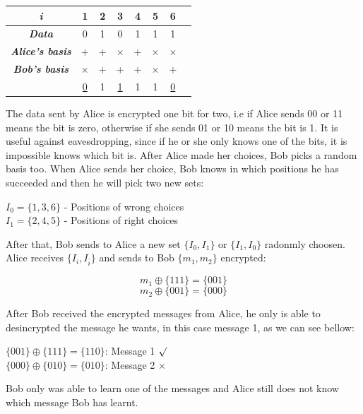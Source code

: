 \begin{table}[H]
\centering
\begin{tabular}{c|c|c|c|c|c|c|c}
\textbf{\textit{i}}         & 1 & 2 & 3 & 4 & 5 & 6      \\ \hline
\textbf{\textit{Data}}  & 0 & 1 & 0 & 1 & 1 & 1     \\ \hline
\textbf{\textit{Alice's basis}} & + & + & $\times$ &+ & $\times$ & $\times$ \\ \hline
\textbf{\textit{Bob's basis}} & $\times$ & + & + &+ & $\times$ & + \\ \hline

		 & \underline{0} & 1 & \underline{1} & 1 & 1 & \underline{0} \\ \hline
\end{tabular}
\end{table}

The data sent by Alice is encrypted one bit for two, i.e if Alice sends 00 or 11 means the bit is zero, otherwise if she sends 01 or 10 means the bit is 1. It is useful against eavesdropping, since if he or she only knows one of the bits, it is impossible knows which bit is.
After Alice made her choices, Bob picks a random basis too. When Alice sends her choice, Bob knows in which positions he has succeeded and then he will pick two new sets:

\begin{center}
$I_{0} = \{ 1,3,6 \}$ - Positions of wrong choices\\
$I_{1} = \{ 2,4,5 \}$ - Positions of right choices
\end{center}

After that, Bob sends to Alice a new set $ \{ I_{0},I_{1} \}$ or $\{ I_{1}, I_{0}\}$ radonmly choosen. Alice receives $\{ I_{i}, I_{\bar{i}}\}$ and sends to Bob $\{ m_{1}, m_{2}\}$ encrypted:

$$m_{1} \oplus{} \{ 1 1 1 \} = \{ 0 0 1\}$$
$$m_{2} \oplus{} \{ 0 0 1 \} = \{ 0 0 0\}$$

After Bob received the encrypted messages from Alice, he only is able to desincrypted the message he wants, in this case message 1, as we can see bellow:
\begin{center}
$\{ 0 0 1\} \oplus{} \{ 1 1 1\} = \{ 1 1 0\} $: Message 1 $\surd$ \\
$\{ 0 0 0\} \oplus{} \{ 0 1 0\} = \{ 0 1 0\} $: Message 2 $\times$ \\
\end{center}

Bob only was able to learn one of the messages and Alice still does not know which message Bob has learnt.

